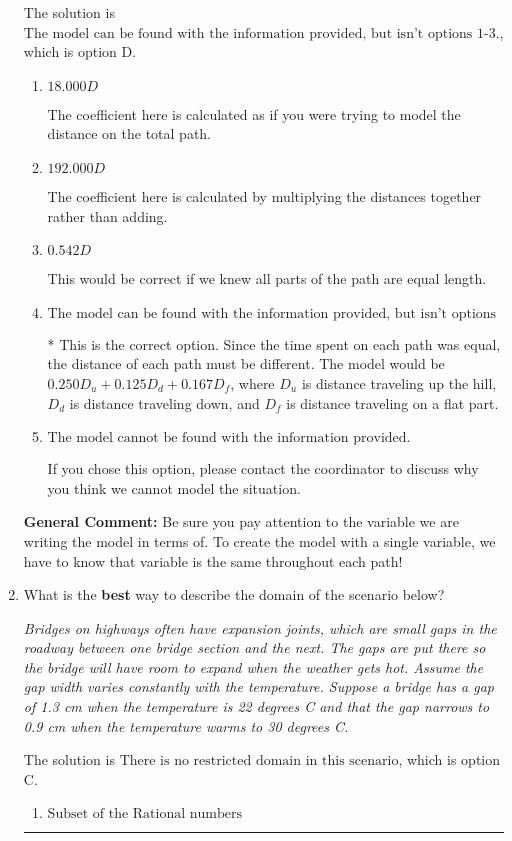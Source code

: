 \documentclass{extbook}[14pt]
\newcommand{\litem}[1]{\item #1

\rule{\textwidth}{0.4pt}}
\begin{document}
\begin{enumerate}
{The solution is \( \text{The model can be found with the information provided, but isn't options 1-3.} \), which is option D.\begin{enumerate}[label=\Alph*.]
\item \( 18.000 D \)

The coefficient here is calculated as if you were trying to model the distance on the total path.
\item \( 192.000 D \)

The coefficient here is calculated by multiplying the distances together rather than adding.
\item \( 0.542 D \)

This would be correct if we knew all parts of the path are equal length.
\item \( \text{The model can be found with the information provided, but isn't options 1-3.} \)

* This is the correct option. Since the time spent on each path was equal, the distance of each path must be different. The model would be $0.250D_u + 0.125D_d + 0.167D_f$, where $D_u$ is distance traveling up the hill, $D_d$ is distance traveling down, and $D_f$ is distance traveling on a flat part.
\item \( \text{The model cannot be found with the information provided.} \)

If you chose this option, please contact the coordinator to discuss why you think we cannot model the situation.
\end{enumerate}

\textbf{General Comment:} Be sure you pay attention to the variable we are writing the model in terms of. To create the model with a single variable, we have to know that variable is the same throughout each path!
}
\litem{
What is the \textbf{best} way to describe the domain of the scenario below?

\begin{center}
    \textit{ Bridges on highways often have expansion joints, which are small gaps in the roadway between one bridge section and the next. The gaps are put there so the bridge will have room to expand when the weather gets hot. Assume the gap width varies constantly with the temperature. Suppose a bridge has a gap of 1.3 cm when the temperature is 22 degrees C and that the gap narrows to 0.9 cm when the temperature warms to 30 degrees C. }
\end{center}


The solution is \( \text{There is no restricted domain in this scenario} \), which is option C.\begin{enumerate}[label=\Alph*.]
\item \( \text{Subset of the Rational numbers} \)


\end{enumerate}}
\end{enumerate}
\end{document}
